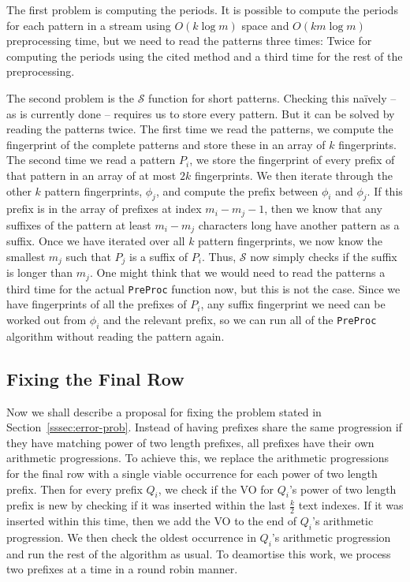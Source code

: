 \documentclass[ %
                    author={Dominic Joseph Moylett},
                    degree={MEng},
                     title={Dictionary Matching with Fingerprints},
                  subtitle={An Empirical Analysis},
                      type={research},
                      year={2015} ]{dissertation}
\begin{document}
The first problem is computing the periods. It is possible to compute the periods for each pattern in a stream \cite{ergun:sublinear-period} using $O(k\log m)$ space and $O(km\log m)$ preprocessing time, but we need to read the patterns three times: Twice for computing the periods using the cited method and a third time for the rest of the preprocessing.

The second problem is the $\mathcal{S}$ function for short patterns. Checking this na\"{i}vely -- as is currently done -- requires us to store every pattern. But it can be solved by reading the patterns twice. The first time we read the patterns, we compute the fingerprint of the complete patterns and store these in an array of $k$ fingerprints. The second time we read a pattern $P_i$, we store the fingerprint of every prefix of that pattern in an array of at most $2k$ fingerprints. We then iterate through the other $k$ pattern fingerprints, $\phi_j$, and compute the prefix between $\phi_i$ and $\phi_j$. If this prefix is in the array of prefixes at index $m_i - m_j - 1$, then we know that any suffixes of the pattern at least $m_i - m_j$ characters long have another pattern as a suffix. Once we have iterated over all $k$ pattern fingerprints, we now know the smallest $m_j$ such that $P_j$ is a suffix of $P_i$. Thus, $\mathcal{S}$ now simply checks if the suffix is longer than $m_j$. One might think that we would need to read the patterns a third time for the actual \texttt{PreProc} function now, but this is not the case. Since we have fingerprints of all the prefixes of $P_i$, any suffix fingerprint we need can be worked out from $\phi_i$ and the relevant prefix, so we can run all of the \texttt{PreProc} algorithm without reading the pattern again.

\subsection{Fixing the Final Row}
\label{ssec:error-fix}

Now we shall describe a proposal for fixing the problem stated in Section~\ref{sssec:error-prob}. Instead of having prefixes share the same progression if they have matching power of two length prefixes, all prefixes have their own arithmetic progressions. To achieve this, we replace the arithmetic progressions for the final row with a single viable occurrence for each power of two length prefix. Then for every prefix $Q_i$, we check if the VO for $Q_i$'s power of two length prefix is new by checking if it was inserted within the last $\frac{k}{2}$ text indexes. If it was inserted within this time, then we add the VO to the end of $Q_i$'s arithmetic progression. We then check the oldest occurrence in $Q_i$'s arithmetic progression and run the rest of the algorithm as usual. To deamortise this work, we process two prefixes at a time in a round robin manner.
\end{document}
